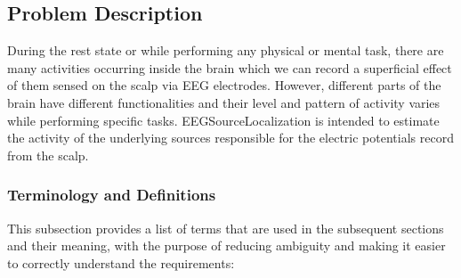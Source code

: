 \documentclass[12pt]{article}
\renewcommand{\progname}{EEGSourceLocalization}
\begin{document}
\subsection{Problem Description} \label{Sec_pd}

During the rest state or while performing any physical or mental task, there are many activities occurring inside the brain which we can record a superficial effect of them sensed on the scalp via EEG electrodes. However, different parts of the brain have different functionalities and their level and pattern of activity varies while performing specific tasks. \progname{} is intended to estimate the activity of the underlying sources responsible for the electric potentials record from the scalp.

\subsubsection{Terminology and  Definitions}


This subsection provides a list of terms that are used in the subsequent
sections and their meaning, with the purpose of reducing ambiguity and making it
easier to correctly understand the requirements:
\end{document}
